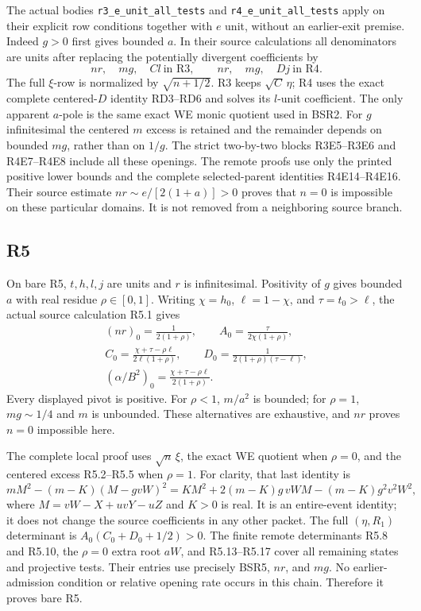 The actual bodies \texttt{r3\_e\_unit\_all\_tests} and
\texttt{r4\_e\_unit\_all\_tests} apply on their explicit
row conditions together with \(e\) unit, without an earlier-exit
premise.  Indeed \(g>0\) first gives bounded \(a\).  In their
source calculations all denominators are units after replacing
the potentially divergent coefficients by
\[
 nr,\quad mg,\quad Cl\ \text{in R3},\qquad
 nr,\quad mg,\quad Dj\ \text{in R4}.
 \tag{BSR4}
\]
The full \(\xi\)-row is normalized by \(\sqrt{n+1/2}\).
R3 keeps \(\sqrt C\,\eta\); R4 uses the exact complete
centered-\(D\) identity RD3--RD6 and solves its \(l\)-unit
coefficient.  The only apparent \(a\)-pole is the same exact
WE monic quotient used in BSR2.  For \(g\) infinitesimal
the centered \(m\) excess is retained and the remainder
depends on bounded \(mg\), rather than on \(1/g\).
The strict two-by-two blocks R3E5--R3E6 and
R4E7--R4E8 include all these openings.
The remote proofs use only the printed positive lower bounds
and the complete selected-parent identities R4E14--R4E16.
Their source estimate \(nr\sim e/[2(1+a)]>0\)
proves that \(n=0\) is impossible on these particular domains.
It is not removed from a neighboring source branch.

\subsection{R5}

On bare R5, \(t,h,l,j\) are units and \(r\) is
infinitesimal.  Positivity of \(g\) gives bounded \(a\)
with real residue \(\rho\in[0,1]\).
Writing \(\chi=h_0\), \(\ell=1-\chi\), and \(\tau=t_0>\ell\),
the actual source calculation R5.1 gives
\[
 \begin{gathered}
 (nr)_0=\frac1{2(1+\rho)},\qquad
 A_0=\frac{\tau}{2\chi(1+\rho)},\\
 C_0=\frac{\chi+\tau-\rho\ell}{2\ell(1+\rho)},\qquad
 D_0=\frac1{2(1+\rho)(\tau-\ell)},\\
 (\alpha/B^2)_0
       =\frac{\chi+\tau-\rho\ell}{2(1+\rho)}.
 \end{gathered}
 \tag{BSR5}
\]
Every displayed pivot is positive.  For \(\rho<1\),
\(m/a^2\) is bounded; for \(\rho=1\), \(mg\sim1/4\)
and \(m\) is unbounded.  These alternatives are exhaustive,
and \(nr\) proves \(n=0\) impossible here.

The complete local proof uses \(\sqrt n\,\xi\), the
exact WE quotient when \(\rho=0\), and the centered
excess R5.2--R5.5 when \(\rho=1\).
For clarity, that last identity is
\[
 mM^2-(m-K)(M-gvW)^2
 =KM^2+2(m-K)g\,vWM-(m-K)g^2v^2W^2,
 \tag{BSR6}
\]
where \(M=vW-X+uvY-uZ\) and \(K>0\) is real.
It is an entire-event identity; it does not change the source
coefficients in any other packet.
The full \((\eta,R_1)\) determinant is
\(A_0(C_0+D_0+1/2)>0\).
The finite remote determinants R5.8 and R5.10, the
\(\rho=0\) extra root \(aW\), and R5.13--R5.17
cover all remaining states and projective tests.
Their entries use precisely BSR5, \(nr\), and \(mg\).
No earlier-admission condition or relative opening rate
occurs in this chain.  Therefore it proves bare R5.

